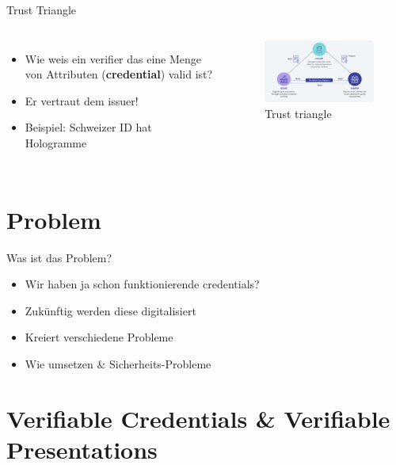 \documentclass[
	ngerman,%
	authorontitle=true,
	]{bfhbeamer}
\begin{document}
\begin{frame}{Trust Triangle}
    \begin{columns}[onlytextwidth,T]
        \column{70mm}  
        \begin{itemize}
            \item Wie weis ein verifier das eine Menge von Attributen (\textbf{credential}) valid ist?
            \item Er vertraut dem issuer!
            \item Beispiel: Schweizer ID hat Hologramme
        \end{itemize}

        \column{70mm}

        \begin{figure}
            \centering
            \includegraphics[width=70mm]{../img/trusttriangle.png}
            \caption{Trust triangle}
        \end{figure}
        
    \end{columns}
\end{frame}

\section{Problem}

\begin{frame}{Was ist das Problem?}
    \begin{itemize}
        \item Wir haben ja schon funktionierende credentials?
        \item Zukünftig werden diese digitalisiert
        \item Kreiert verschiedene Probleme
        \item Wie umsetzen \& Sicherheits-Probleme
    \end{itemize}
\end{frame}

\section{Verifiable Credentials \& Verifiable Presentations}
\end{document}
